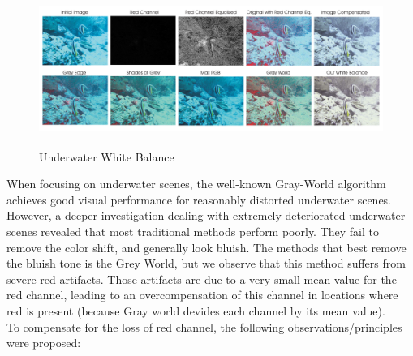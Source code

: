 \documentclass[hidelinks, 12pt]{report}
\begin{document}
\begin{figure}[H]
\centering
\includegraphics[width=15cm,height=5cm]{White.png}
\caption[Underwater White Balance]{Underwater White Balance}
\label{Underwater White Balance}
\end{figure}
When focusing on underwater scenes, the well-known Gray-World algorithm achieves good visual performance for reasonably distorted underwater scenes. However, a deeper investigation dealing with extremely deteriorated underwater scenes revealed that most traditional methods perform poorly. They fail to remove the color shift, and generally look bluish. The methods that best remove the bluish tone is the Grey World, but we observe that this method suffers from severe red artifacts. Those artifacts are due to a very small mean value for the red channel, leading to an overcompensation of this channel in locations where red is present (because Gray world devides each channel by its mean value).\\
To compensate for the loss of red channel, the following observations/principles were proposed:
\end{document}
